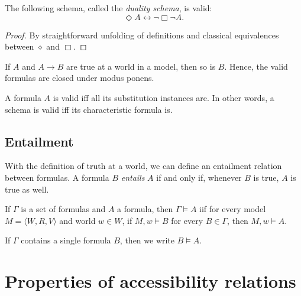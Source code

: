 \begin{proposition}
  \label{duality-schema}
  \leanok
The following schema, called the \emph{duality schema}, is valid:
\[
\Diamond A \leftrightarrow \neg \Box \neg A.
\]
\end{proposition}
\begin{proof}
  \label{proof:duality-schema}
  \leanok
  By straightforward unfolding of definitions and classical equivalences between \(\diamond\) and \(\Box\).
\end{proof}

\begin{proposition}
  \label{modus-ponens-validity}
  If $A$ and $A \rightarrow B$ are true at a world in a model,
  then so is $B$. Hence, the valid formulas are closed under modus ponens.
\end{proposition}

\begin{proposition}
  \label{substitution-validity}
    \leanok
  A formula $A$ is valid iff all its substitution instances are.
  In other words, a schema is valid iff its characteristic formula is.
\end{proposition}

\subsection{Entailment}
With the definition of truth at a world, we can define an entailment
relation between formulas. A formula $B$ \emph{entails} $A$ if and only if, whenever
$B$ is true, $A$ is true as well.

\begin{definition}
  \label{semantic-entailment}
  If $\Gamma$ is a set of formulas and $A$ a formula, then
  $\Gamma \vDash A$ iif
  for every model $M = \langle W, R, V \rangle$ and world $w \in W$,
  if $M, w \vDash B$ for every $B \in \Gamma$, then $M, w \vDash A$.

  If $\Gamma$ contains a single formula $B$, then we write $B \vDash A$.
\end{definition}


\section{Properties of accessibility relations}

